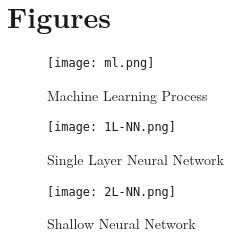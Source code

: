 
\section{Figures}\label{section:figs}
\begin{figure}[h]
 \centering
 \texttt{[image: ml.png]}
  \caption{Machine Learning Process}\label{fig:learn}
\end{figure}

\begin{figure}
 \centering
 \texttt{[image: 1L-NN.png]}
 \caption{Single Layer Neural Network}
 \label{fig:single}
\end{figure}

\begin{figure}
 \centering
 \texttt{[image: 2L-NN.png]}
 \caption{Shallow Neural Network}
 \label{fig:shallow}\label{fig:shallow}
\end{figure}


